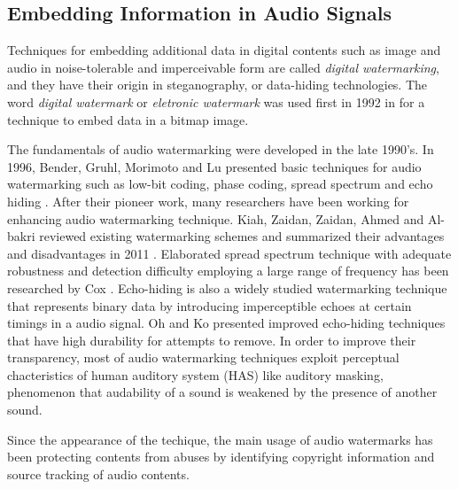 \subsection{Embedding Information in Audio Signals}
Techniques for embedding additional data in digital contents such as image and audio in noise-tolerable and imperceivable form are called {\it digital watermarking}, and they have their origin in steganography, or data-hiding technologies.
The word {\it digital watermark} or {\it eletronic watermark} was used first in 1992 in \cite{tirkel1993electronic} for a technique to embed data in a bitmap image.

The fundamentals of audio watermarking were developed in the late 1990's.
In 1996, Bender, Gruhl, Morimoto and Lu presented basic techniques for audio watermarking such as low-bit coding, phase coding, spread spectrum and echo hiding \cite{bender1996techniques}.
After their pioneer work, many researchers have been working for enhancing audio watermarking technique.
Kiah, Zaidan, Zaidan, Ahmed and Al-bakri reviewed existing watermarking schemes and summarized their advantages and disadvantages in 2011 \cite{mat2011review}.
Elaborated spread spectrum technique with adequate robustness and detection difficulty employing a large range of frequency has been researched by Cox \cite{cox1997secure,cox2001digital}.
Echo-hiding is also a widely studied watermarking technique that represents binary data by introducing imperceptible echoes at certain timings in a audio signal. Oh \cite{oh2001new} and Ko \cite{ko2005time} presented improved echo-hiding techniques that have high durability for attempts to remove.
In order to improve their transparency, most of audio watermarking techniques exploit perceptual chacteristics of human auditory system (HAS) like auditory masking, phenomenon that audability of a sound is weakened by the presence of another sound.

Since the appearance of the techique, the main usage of audio watermarks has been
protecting contents from abuses by identifying copyright information and source tracking of audio contents.

